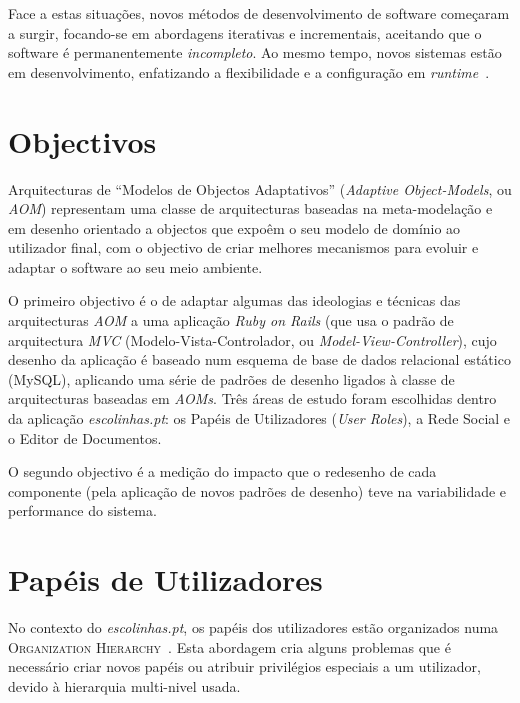 \documentclass[9pt,a4paper]{extarticle}
\begin{document}
\begin{multicols}{2}

Face a estas situações, novos métodos de desenvolvimento de software começaram a surgir, focando-se em abordagens iterativas e incrementais, aceitando que o software é permanentemente \emph{incompleto}. Ao mesmo tempo, novos sistemas estão em desenvolvimento, enfatizando a flexibilidade e a configuração em \emph{runtime}~\cite{YJ02}.

\section{Objectivos}\label{sec:objectives}

Arquitecturas de ``Modelos de Objectos Adaptativos'' (\emph{Adaptive Object-Models}, ou \emph{AOM}) representam uma classe de arquitecturas baseadas na meta-modelação e em desenho orientado a objectos que expoêm o seu modelo de domínio ao utilizador final, com o objectivo de criar melhores mecanismos para evoluir e adaptar o software ao seu meio ambiente.

O primeiro objectivo é o de adaptar algumas das ideologias e técnicas das arquitecturas \emph{AOM} a uma aplicação \emph{Ruby on Rails} (que usa o padrão de arquitectura \emph{MVC} (Modelo-Vista-Controlador, ou \emph{Model-View-Controller}), cujo desenho da aplicação é baseado num esquema de base de dados relacional estático (MySQL), aplicando uma série de padrões de desenho ligados à classe de arquitecturas baseadas em \emph{AOMs}. Três áreas de estudo foram escolhidas dentro da aplicação \emph{escolinhas.pt}: os Papéis de Utilizadores (\emph{User Roles}), a Rede Social e o Editor de Documentos.

O segundo objectivo é a medição do impacto que o redesenho de cada componente (pela aplicação de novos padrões de desenho) teve na variabilidade e performance do sistema.

\section{Papéis de Utilizadores}\label{sec:user_roles}

No contexto do \emph{escolinhas.pt}, os papéis dos utilizadores estão organizados numa \textsc{Organization Hierarchy}~\cite{fowler_accountability}. Esta abordagem cria alguns problemas que é necessário criar novos papéis ou atribuir privilégios especiais a um utilizador, devido à hierarquia multi-nivel usada.


\end{multicols}
\end{document}
